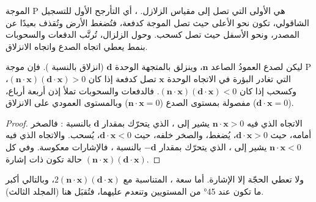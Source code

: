 الموجة P هي الأولى التي تصل إلى مقياس الزلازل. ، أي التأرجح الأول للتسجيل الشاقولي، تكون نحو الأعلى حيث تصل الموجة كدفعة، فتُضغط الأرض وتُقذف بعيدًا عن المصدر، ونحو الأسفل حيث تصل كسحب. وحول الزلزال، تُرتَّب الدفعات والسحوبات بنمط يعطي اتجاه الصدع واتجاه الانزلاق.

\begin{proposition}\label{prop:b1:earthquake-source:first-motion}
ليكن لصدع العمودُ الصاعد $\mathbf n$، وينزلق بالمتجهة الوحدة $\mathbf d$ (انزلاق  بالنسبة ). فإن موجة P التي تغادر البؤرة في الاتجاه الوحدة $\mathbf x$ تصل كدفعة إذا كان
$(\mathbf n\cdot\mathbf x)(\mathbf d\cdot\mathbf x) > 0$، وكسحب إذا كان $(\mathbf n\cdot\mathbf x)(\mathbf d\cdot\mathbf x) < 0$. فالدفعات والسحوبات تملأ إذن أربعة أرباع، مفصولة بمستوى الصدع ($\mathbf n\cdot\mathbf x = 0$) وبالمستوى العمودي على الانزلاق ($\mathbf d\cdot\mathbf x = 0$).
\end{proposition}

\begin{proof}
الاتجاه الذي فيه $\mathbf n\cdot\mathbf x > 0$ يشير إلى ، الذي يتحرّك بمقدار $\mathbf d$ بالنسبة : فالصخر أمامه، حيث $\mathbf d\cdot\mathbf x > 0$، يُضغط، والصخر خلفه، حيث $\mathbf d\cdot\mathbf x < 0$، يُسحب. والاتجاه الذي فيه $\mathbf n\cdot\mathbf x < 0$ يشير إلى ، الذي يتحرّك بمقدار $-\mathbf d$ بالنسبة ، فالإشارات معكوسة. وفي كل حالة تكون  ذات إشارة $(\mathbf n\cdot\mathbf x)(\mathbf
d\cdot\mathbf x)$.
\end{proof}

ولا تعطي الحجّة إلا الإشارة. أما سعة ، المتناسبة مع $2(\mathbf n\cdot\mathbf x)(\mathbf d\cdot\mathbf x)$، وبالتالي أكبر ما تكون عند \ang{45} من المستويين وتنعدم عليهما، فتُقبَل هنا (المجلد الثالث).

